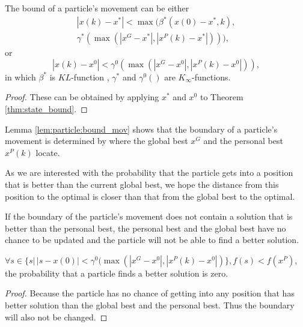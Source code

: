 \begin{mylem}
\label{lem:particle:bound_mov}
The bound of a particle's movement can be either 
\begin{equation}
\begin{aligned}
| x(k) - x^{*} | < \max ( \beta^{*} ( x(0) - x^{*}, k ), \\ \gamma^{*} ( \max ( | x^{G} - x^{*} | , | x^{P}(k) - x^{*}  | ) ) ),
\end{aligned}
\end{equation}
or 
\begin{equation}
| x(k) - x^{0} | < \gamma^{0} ( \max ( | x^{G} - x^{0} | , | x^{P}(k) - x^{0}  | ) ),
\end{equation}
in which $ \beta^{*} $ is $ KL $-function , $ \gamma^{*}  $ and $ \gamma^{0} () $ are $ K_{\infty} $-functions.
\begin{proof}
These can be obtained by applying $ x^{*} $ and $ x^{0} $ to Theorem \ref{thm:state_bound}.
\end{proof}
\end{mylem}
Lemma \ref{lem:particle:bound_mov} shows that the boundary of a particle's movement is determined by where the global best $ x^{G} $ and the personal best $ x^{P}(k) $ locate.

As we are interested with the probability that the particle gets into a position that is better than the current global best, we hope the distance from this position to the optimal is closer than that from the global best to the optimal.

If the boundary of the particle's movement does not contain a solution that is better than the personal best, the personal best and the global best have no chance to be updated and the particle will not be able to find a better solution.
\begin{mythm}
\label{thm:multimodal:out_of_scope}
$ \forall s \in \{ s | \, |s - x(0)| < \gamma^{0} ( \max ( | x^{G} - x^{0} | , | x^{P}(k) - x^{0}  | ) \}, f(s) < f(x^{P})  $, the probability that a particle finds a better solution is zero.
\begin{proof}
Because the particle has no chance of getting into any position that has better solution than the global best and the personal best.
Thus the boundary will also not be changed.
\end{proof}
\end{mythm}

